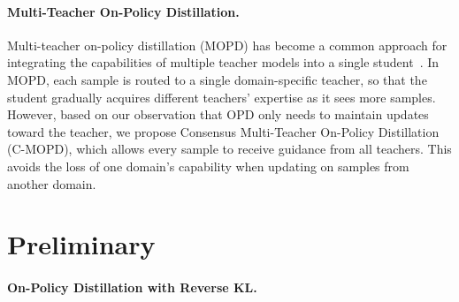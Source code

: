 \documentclass{article}
\theoremstyle{remark}
\begin{document}
\paragraph{Multi-Teacher On-Policy Distillation.}
Multi-teacher on-policy distillation (MOPD) has become a common approach for integrating the capabilities of multiple teacher models into a single student~\citep{ma2026mopd,blakeman2025nvidia,team2026kimi,gao2026open, chen2026counteraction,sun2026d,he2026learn}. In MOPD, each sample is routed to a single domain-specific teacher, so that the student gradually acquires different teachers' expertise as it sees more samples. However, based on our observation that OPD only needs to maintain updates toward the teacher, we propose Consensus Multi-Teacher On-Policy Distillation (C-MOPD), which allows every sample to receive guidance from all teachers. This avoids the loss of one domain's capability when updating on samples from another domain.


\section{Preliminary} \label{sec:preliminary}
\paragraph{On-Policy Distillation with Reverse KL.}
\end{document}
